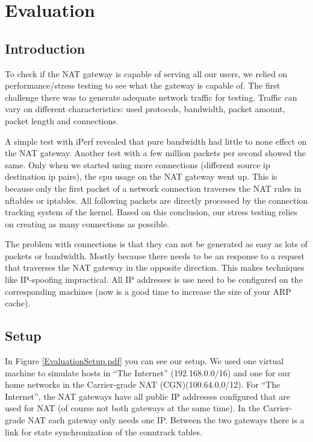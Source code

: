 \documentclass{report}
\begin{document}
\chapter{Evaluation}\label{evaluation}

\section{Introduction}\label{introduction-1}

To check if the NAT gateway is capable of serving all our users, we
relied on performance/stress testing to see what the gateway is capable
of. The first challenge there was to generate adequate network traffic
for testing. Traffic can vary on different characteristics: used
protocols, bandwidth, packet amount, packet length and connections.

A simple test with iPerf\cite{iperf} revealed that pure bandwidth had little
to none effect on the NAT gateway. Another test with a few million
packets per second showed the same. Only when we started using more
connections (different source ip destination ip pairs), the cpu usage on
the NAT gateway went up. This is because only the first packet of a
network connection traverses the NAT rules in nftables or iptables. All
following packets are directly processed by the connection tracking
system of the kernel. Based on this conclusion, our stress testing relies on creating
as many connections as possible.

The problem with connections is that they can not be generated as easy as
lots of packets or bandwidth. Mostly because there needs to be an
response to a request that traverses the NAT gateway in the opposite
direction. This makes techniques like IP-spoofing impractical. All
IP addresses is use need to be configured on the corresponding machines (now is
a good time to increase the size of your ARP cache).

\section{Setup}\label{setup-1}

In Figure \ref{EvaluationSetup.pdf} you can see our setup. We used one virtual machine to simulate
hosts in ``The Internet'' (192.168.0.0/16) and one for our home networks
in the Carrier-grade NAT (CGN)(100.64.0.0/12). For ``The Internet'', the
NAT gateways have all public IP addresses configured that are used for
NAT (of course not both gateways at the same time). In the Carrier-grade
NAT each gateway only needs one IP. Between the two gateways there is a
link for state synchronization of the conntrack tables.
\end{document}

